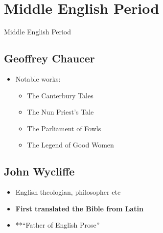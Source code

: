 \documentclass[
  12pt,
  ignorenonframetext,
  progressbar=frametitle]{beamer}
\providecommand{\tightlist}{%
  \setlength{\itemsep}{0pt}\setlength{\parskip}{0pt}}
\begin{document}
\section{Middle English Period}
\begin{frame}[allowframebreaks]
{Middle English Period}
\subsection{Geoffrey Chaucer}
\begin{itemize}
\tightlist
\item
  Notable works:

  \begin{itemize}
  \tightlist
  \item
    The Canterbury Tales
  \item
    The Nun Priest's Tale
  \item
    The Parliament of Fowls
  \item
    The Legend of Good Women
  \end{itemize}
\end{itemize}


\subsection{John Wycliffe}
\begin{itemize}
\tightlist
\item
  English theologian, philosopher etc
\item
  \textbf{First translated the Bible from Latin}
\item
  **``Father of English Prose''
\end{itemize}

\end{frame}
\end{document}
